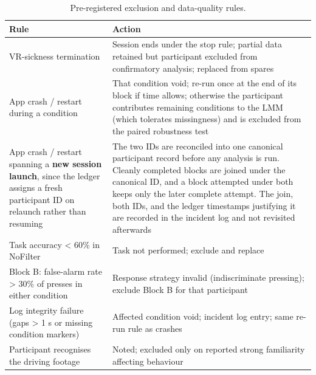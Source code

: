 \begin{longtable}{p{}|p{}}
\caption{Pre-registered exclusion and data-quality rules.}\\
\hline
\textbf{Rule} & \textbf{Action} \\
\hline
\endhead
\hline
VR-sickness termination & Session ends under the stop rule; partial data retained but participant excluded from confirmatory analysis; replaced from spares \\
App crash / restart during a condition & That condition void; re-run once at the end of its block if time allows; otherwise the participant contributes remaining conditions to the LMM (which tolerates missingness) and is excluded from the paired robustness test \\
App crash / restart spanning a \textbf{new session launch}, since the ledger assigns a fresh participant ID on relaunch rather than resuming & The two IDs are reconciled into one canonical participant record before any analysis is run. Cleanly completed blocks are joined under the canonical ID, and a block attempted under both keeps only the later complete attempt. The join, both IDs, and the ledger timestamps justifying it are recorded in the incident log and not revisited afterwards \\
Task accuracy < 60\% in NoFilter & Task not performed; exclude and replace \\
Block B: false-alarm rate > 30\% of presses in either condition & Response strategy invalid (indiscriminate pressing); exclude Block B for that participant \\
Log integrity failure (gaps > 1 s or missing condition markers) & Affected condition void; incident log entry; same re-run rule as crashes \\
Participant recognises the driving footage & Noted; excluded only on reported strong familiarity affecting behaviour \\
\hline
\end{longtable}
